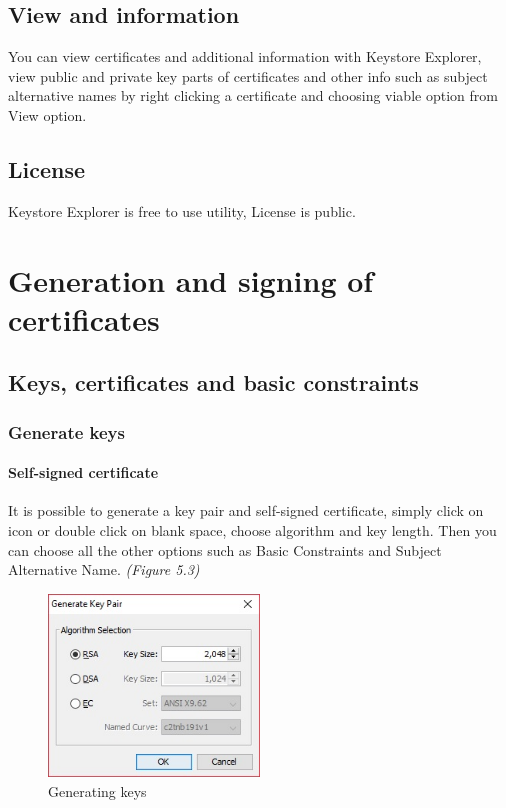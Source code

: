 \documentclass[10pt, a4paper]{report}
\begin{document}
\subsection{View and information}
You can view certificates and additional information with Keystore Explorer, view public and private key parts of certificates and other info such as subject alternative names by right clicking a certificate and choosing viable option from View option.

  \subsection{License}
Keystore Explorer is free to use utility, License is public.
  
\section{Generation and signing of certificates}

  \subsection{Keys, certificates and basic constraints}
  
    \subsubsection{Generate keys}
    
      \paragraph{Self-signed certificate}
It is possible to generate a key pair and self-signed certificate, simply click on icon or double click on blank space, choose algorithm and key length. Then you can choose all the other options such as Basic Constraints and Subject Alternative Name. \textit{(Figure 5.3)}

\begin{figure}[!htbp]
 \caption{Generating keys}
 \centering
  \includegraphics[width=0.5\textwidth]{../Dependancies/Keystore_Explorer/genKeys.jpg}
\end{figure}
\end{document}

